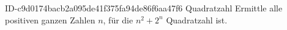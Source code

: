 \begin{exercise}
      {ID-c9d0174bacb2a095de41f375fa94de86f6aa47f6}
      {Quadratzahl}
  \ifproblem\problem
    Ermittle alle positiven ganzen Zahlen $n$, für die $n^{2}+2^{n}$
    Quadratzahl ist.
  \fi
\end{exercise}
